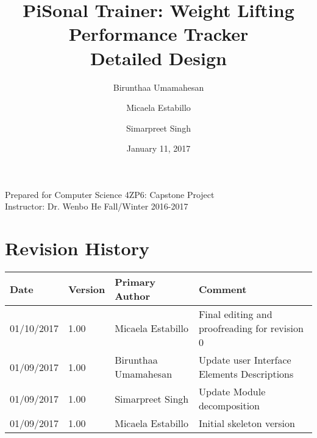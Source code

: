 \documentclass{article}
\title{
PiSonal Trainer: Weight Lifting Performance Tracker\\
\Large {Detailed Design}
}
\date{January 11, 2017}
\author{Birunthaa Umamahesan \and Micaela Estabillo \and Simarpreet Singh}
\begin{document}
\thispagestyle{plain}
\maketitle
\vfill
\begin{center}
    Prepared for Computer Science 4ZP6: Capstone Project \\
    Instructor: Dr. Wenbo He
    Fall/Winter 2016-2017\\
\end{center}
\newpage

\tableofcontents

\listoffigures

\listoftables

\thispagestyle{plain}

\newpage

\section*{Revision History}
\begingroup
\begin{tabular}{ | p{2cm} | p{1.5cm} | p{3.8cm} | p{7cm} |} 
    \hline
    \textbf{Date} & \textbf{Version} & \textbf{Primary Author} & \textbf{Comment}\\
    \hline
    01/10/2017 & 1.00 & Micaela Estabillo & Final editing and proofreading for revision 0\\ 
    \hline
    01/09/2017 & 1.00 & Birunthaa Umamahesan & Update user Interface Elements Descriptions \\
    \hline
    01/09/2017 & 1.00 & Simarpreet Singh & Update Module decomposition\\ 
    \hline
    01/09/2017 & 1.00 & Micaela Estabillo & Initial skeleton version\\
    \hline
\end{tabular}
\endgroup


\begin{center}
\end{center}
\end{document}
